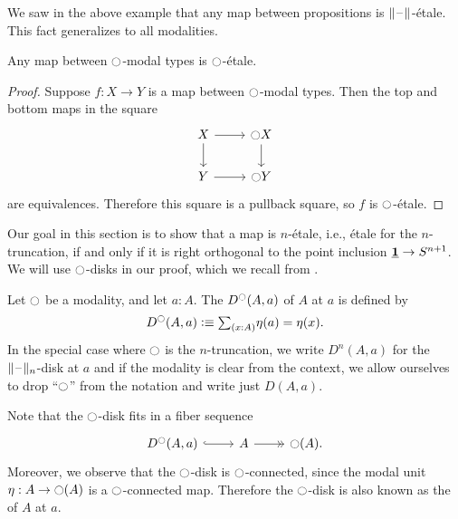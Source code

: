 \documentclass[9pt,twosided]{amsart}
\begin{document}
We saw in the above example that any map between propositions is $\brck{\blank}$-\'etale. This fact generalizes to all modalities.

\begin{lem}\label{lem:etale_modal}
Any map between ${\ocircle}$-modal types is ${\ocircle}$-\'etale.
\end{lem}

\begin{proof}
Suppose $f:X\to Y$ is a map between ${\ocircle}$-modal types. Then the top and bottom maps in the square
\begin{equation*}
\begin{tikzcd}
X \arrow[r] \arrow[d] & \modal X \arrow[d] \\
Y \arrow[r] & \modal Y
\end{tikzcd}
\end{equation*}
are equivalences. Therefore this square is a pullback square, so $f$ is ${\ocircle}$-\'etale.
\end{proof}

Our goal in this section is to show that a map is $n$-\'etale, i.e., \'etale for the $n$-truncation, if and only if it is right orthogonal to the point inclusion $\underline{\mathbf{1}}\to S^{n+1}$. We will use ${\ocircle}$-disks in our proof, which we recall from \cite{wellen-thesis}.

\begin{defn}
  Let ${\ocircle}$ be a modality, and let $a:A$. The  $D^{{\ocircle}}(A,a)$ of $A$ at $a$ is defined by
  \begin{equation*}
    D^\modal(A,a)\defeq \sm{x:A}\eta(a)=\eta(x).
  \end{equation*}
  In the special case where ${\ocircle}$ is the $n$-truncation, we write $D^n(A,a)$ for the $\trunc{n}{\blank}$-disk at $a$ and if the modality is clear from the context, we allow ourselves to drop ``${\ocircle}$'' from the notation and write just $D(A,a)$.
\end{defn}

Note that the ${\ocircle}$-disk fits in a fiber sequence
\begin{equation*}
  \begin{tikzcd}
    D^\modal(A,a) \arrow[r,hook] & A \arrow[r,->>] & \modal(A).
  \end{tikzcd}
\end{equation*}
Moreover, we observe that the ${\ocircle}$-disk is ${\ocircle}$-connected, since the modal unit $\eta:A\to{\ensuremath{\ocircle}}(A)$ is a ${\ocircle}$-connected map. Therefore the ${\ocircle}$-disk is also known as the  of $A$ at $a$.
\end{document}
